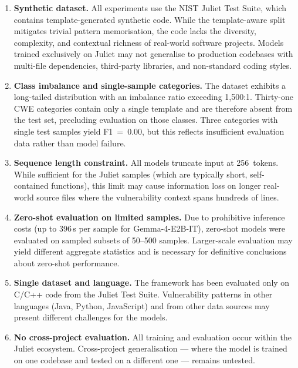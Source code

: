 \documentclass[conference]{IEEEtran}
\begin{document}
\begin{enumerate}
    \item \textbf{Synthetic dataset.}
          All experiments use the NIST Juliet Test Suite, which contains
          template-generated synthetic code.  While the template-aware split
          mitigates trivial pattern memorisation, the code lacks the
          diversity, complexity, and contextual richness of real-world
          software projects.  Models trained exclusively on Juliet may not
          generalise to production codebases with multi-file dependencies,
          third-party libraries, and non-standard coding styles.

    \item \textbf{Class imbalance and single-sample categories.}
          The dataset exhibits a long-tailed distribution with an imbalance
          ratio exceeding 1,500:1.  Thirty-one CWE categories contain only
          a single template and are therefore absent from the test set,
          precluding evaluation on those classes.  Three categories with
          single test samples yield F1~=~0.00, but this reflects
          insufficient evaluation data rather than model failure.

    \item \textbf{Sequence length constraint.}
          All models truncate input at 256~tokens.  While sufficient for the
          Juliet samples (which are typically short, self-contained
          functions), this limit may cause information loss on longer
          real-world source files where the vulnerability context spans
          hundreds of lines.

    \item \textbf{Zero-shot evaluation on limited samples.}
          Due to prohibitive inference costs (up to 396\,s per sample for
          Gemma-4-E2B-IT), zero-shot models were evaluated on sampled
          subsets of 50--500 samples.  Larger-scale evaluation may yield
          different aggregate statistics and is necessary for definitive
          conclusions about zero-shot performance.

    \item \textbf{Single dataset and language.}
          The framework has been evaluated only on C/C++ code from the
          Juliet Test Suite.  Vulnerability patterns in other languages
          (Java, Python, JavaScript) and from other data sources may
          present different challenges for the models.

    \item \textbf{No cross-project evaluation.}
          All training and evaluation occur within the Juliet ecosystem.
          Cross-project generalisation --- where the model is trained on one
          codebase and tested on a different one --- remains untested.


\end{enumerate}
\end{document}
